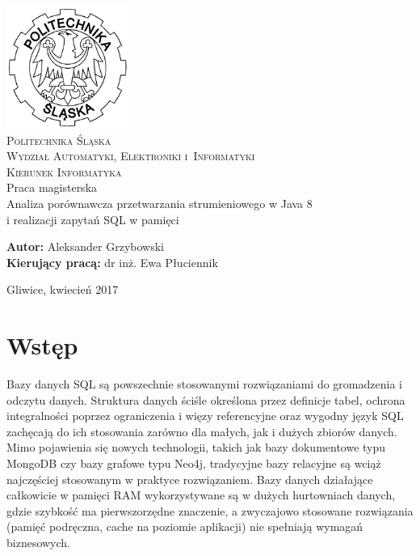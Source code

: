 \documentclass[12pt]{extarticle}
\begin{document}
\begin{titlepage}
    \begin{center}
        \includegraphics[width=4cm]{polsl.png}\\[1cm]
        \textsc{\LARGE{Politechnika Śląska}}\\[0.5cm]
        \textsc{\LARGE{Wydział Automatyki, Elektroniki i~Informatyki}}\\[0.5cm]
        \textsc{\LARGE{Kierunek Informatyka}}\\[2.5cm]
        \LARGE{Praca magisterska}\\[1cm]
        \begingroup
            \fontsize{14pt}{17pt}\selectfont
            Analiza porównawcza przetwarzania strumieniowego w Java 8 \\ i realizacji zapytań SQL w pamięci
        \endgroup
    \end{center}
    \vspace{2cm}
    \begingroup
        \fontsize{14pt}{17pt}\selectfont
        \textbf{Autor:} Aleksander Grzybowski\\
        \textbf{Kierujący pracą:} dr inż. Ewa Płuciennik\\
    \endgroup

    \vspace{3.0cm}
    \begingroup
        \fontsize{12pt}{14pt}\selectfont
        \begin{center}
        Gliwice, kwiecień 2017
        \end{center}
    \endgroup
\end{titlepage}

\clearpage

\tableofcontents

\newpage

\section{Wstęp}


    Bazy danych SQL są powszechnie stosowanymi rozwiązaniami do gromadzenia i odczytu danych. Struktura danych ściśle określona przez definicje tabel, ochrona integralności poprzez ograniczenia i więzy referencyjne oraz wygodny język SQL zachęcają do ich stosowania zarówno dla małych, jak i dużych zbiorów danych. Mimo pojawienia się nowych technologii, takich jak bazy dokumentowe typu MongoDB czy bazy grafowe typu Neo4j, tradycyjne bazy relacyjne są wciąż najczęściej stosowanym w praktyce rozwiązaniem. Bazy danych działające całkowicie w pamięci RAM wykorzystywane są w dużych hurtowniach danych, gdzie szybkość ma pierwszorzędne znaczenie, a zwyczajowo stosowane rozwiązania (pamięć podręczna, cache na poziomie aplikacji) nie spełniają wymagań biznesowych.
\end{document}
